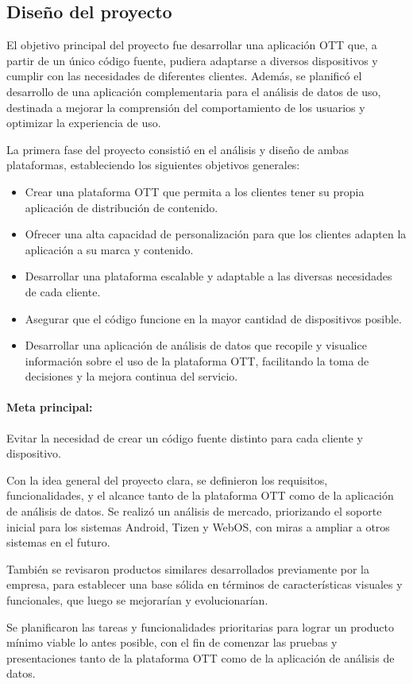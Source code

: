 \subsection{Diseño del proyecto}
\label{sec:metodologia_diseno}

El objetivo principal del proyecto fue desarrollar una aplicación OTT que, a partir de un único código fuente, 
pudiera adaptarse a diversos dispositivos y cumplir con las necesidades de diferentes clientes. Además, se planificó 
el desarrollo de una aplicación complementaria para el análisis de datos de uso, destinada a mejorar la comprensión 
del comportamiento de los usuarios y optimizar la experiencia de uso.

La primera fase del proyecto consistió en el análisis y diseño de ambas plataformas, estableciendo los siguientes 
objetivos generales:
\begin{itemize}
    \item Crear una plataforma OTT que permita a los clientes tener su propia aplicación de distribución de contenido.
    \item Ofrecer una alta capacidad de personalización para que los clientes adapten la aplicación a su marca y contenido.
    \item Desarrollar una plataforma escalable y adaptable a las diversas necesidades de cada cliente.
    \item Asegurar que el código funcione en la mayor cantidad de dispositivos posible.
    \item Desarrollar una aplicación de análisis de datos que recopile y visualice información sobre el uso de la plataforma OTT, facilitando la toma de decisiones y la mejora continua del servicio.
\end{itemize}

\paragraph{Meta principal:} Evitar la necesidad de crear un código fuente distinto para cada cliente y dispositivo.

Con la idea general del proyecto clara, se definieron los requisitos, funcionalidades, y el alcance tanto de la 
plataforma OTT como de la aplicación de análisis de datos. Se realizó un análisis de mercado, priorizando el 
soporte inicial para los sistemas Android, Tizen y WebOS, con miras a ampliar a otros sistemas en el futuro.

También se revisaron productos similares desarrollados previamente por la empresa, para establecer una base 
sólida en términos de características visuales y funcionales, que luego se mejorarían y evolucionarían.

Se planificaron las tareas y funcionalidades prioritarias para lograr un producto mínimo viable lo antes 
posible, con el fin de comenzar las pruebas y presentaciones tanto de la plataforma OTT como de la aplicación 
de análisis de datos.
